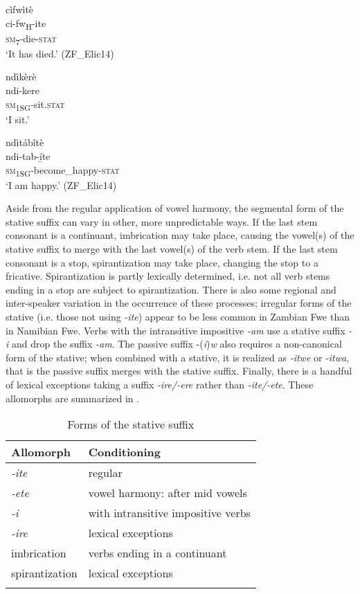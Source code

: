 \ea
\label{bkm:Ref72311760}
\glll cìfwìtè\\
ci-fw\textsubscript{H}-ite\\
\textsc{sm}\textsubscript{7}-die-\textsc{stat}\\
\glt ‘It has died.’ (ZF\_Elic14)
\z

\ea
\label{bkm:Ref72311784}
\glll ndìkèrè\\
ndi-kere\\
\textsc{sm}\textsubscript{1SG}-sit.\textsc{stat}\\
\glt ‘I sit.’
\z

\ea
\label{bkm:Ref72311806}
\glll ndìtábîtè\\
ndi-tab-í̲te\\
\textsc{sm}\textsubscript{1SG}-become\_happy-\textsc{stat}\\
\glt ‘I am happy.’ (ZF\_Elic14)
\z

Aside from the regular application of vowel harmony, the segmental form of the stative suffix can vary in other, more unpredictable ways. If the last stem consonant is a continuant, imbrication may take place, causing the vowel(s) of the stative suffix to merge with the last vowel(s) of the verb stem. If the last stem consonant is a stop, spirantization may take place, changing the stop to a fricative. Spirantization is partly lexically determined, i.e. not all verb stems ending in a stop are subject to spirantization. There is also some regional and inter-speaker variation in the occurrence of these processes; irregular forms of the stative (i.e. those not using \textit{-ite}) appear to be less common in Zambian Fwe than in Namibian Fwe. Verbs with the intransitive impositive \textit{-am} use a stative suffix \textit{-i} and drop the suffix \textit{-am}. The passive suffix -(\textit{i})\textit{w} also requires a non-canonical form of the stative; when combined with a stative, it is realized as \textit{-itwe} or \nobreakdash-\textit{itwa}, that is the passive suffix merges with the stative suffix. Finally, there is a handful of lexical exceptions taking a suffix \textit{-ire/-ere} rather than \textit{-ite/-ete}. These allomorphs are summarized in .

\begin{table}
\label{bkm:Ref72312294}\caption{\label{tab:9:2}Forms of the stative suffix}

\begin{tabular}{ll}
\lsptoprule
Allomorph & Conditioning\\
\midrule
{\itshape -ite} & regular\\
{\itshape -ete} & vowel harmony: after mid vowels\\
{\itshape -i} & with intransitive impositive verbs\\
{\itshape -ire} & lexical exceptions\\
imbrication & verbs ending in a continuant\\
spirantization & lexical exceptions\\
\lspbottomrule
\end{tabular}
\end{table}

